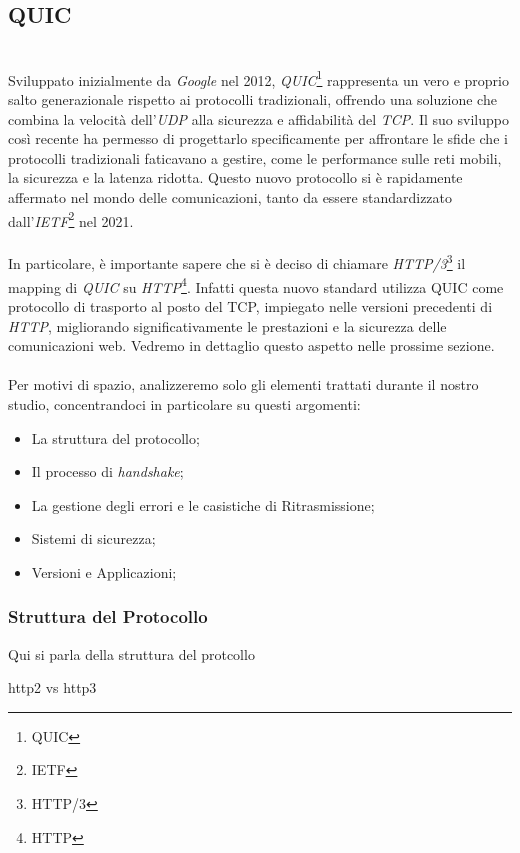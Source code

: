 \subsection{QUIC}
~\\
\indent Sviluppato inizialmente da \emph{Google} nel 2012, \emph{QUIC}\footnote{\gls{QUIC}} rappresenta un vero e proprio salto generazionale rispetto ai protocolli tradizionali, offrendo una soluzione che combina la velocità dell'\emph{UDP} alla sicurezza e affidabilità del \emph{TCP}. 
Il suo sviluppo così recente ha permesso di progettarlo specificamente per affrontare le sfide che i protocolli tradizionali faticavano a gestire, come le performance sulle reti mobili, la sicurezza e la latenza ridotta. Questo nuovo protocollo si è rapidamente affermato nel mondo delle comunicazioni, tanto da essere standardizzato dall'\emph{IETF}\footnote{\gls{IETF}} nel 2021.
\\\\
In particolare, è importante sapere che si è deciso di chiamare \emph{HTTP/3}\footnote{\gls{HTTP/3}} il mapping di \emph{QUIC} su \emph{HTTP}\footnote{\gls{HTTP}}. Infatti questa nuovo standard utilizza QUIC come protocollo di trasporto al posto del TCP, impiegato nelle versioni precedenti di \emph{HTTP}, migliorando significativamente le prestazioni e la sicurezza delle comunicazioni web.
Vedremo in dettaglio questo aspetto nelle prossime sezione.
\\\\
\noindent Per motivi di spazio, analizzeremo solo gli elementi trattati durante il nostro studio, concentrandoci in particolare su questi argomenti:
\begin{itemize}
    \item La struttura del protocollo;
    \item Il processo di \emph{handshake};
    \item La gestione degli errori e le casistiche di Ritrasmissione;
    \item Sistemi di sicurezza;
    \item Versioni e Applicazioni;
\end{itemize}

\subsubsection{Struttura del Protocollo}

Qui si parla della struttura del protcollo 

http2 vs http3

